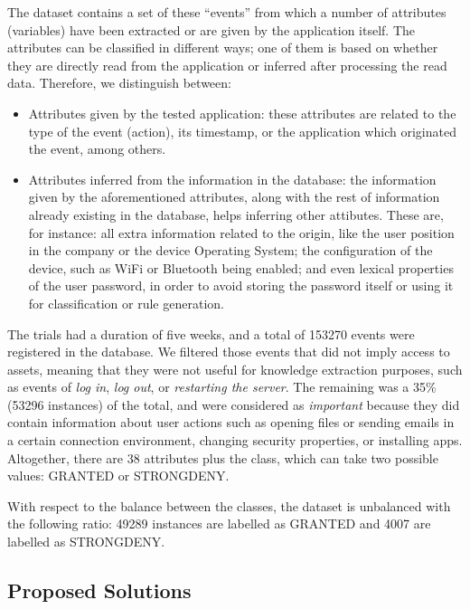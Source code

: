 \documentclass[a4paper,10pt,twocolumn,preprint,3p]{elsarticle}
\begin{document}
The dataset contains a set of these ``events'' from which a number of attributes (variables) have been extracted or are given by the application itself. The attributes can be classified in different ways; one of them is based on whether they are directly read from the application or inferred after processing the read data. Therefore, we distinguish between:
\begin{itemize}
  \item Attributes given by the tested application: these attributes
    are related to the type of the event (action), its timestamp, or
    the application which originated the event, among others. 
  \item Attributes inferred from the information in the database: the information given by the aforementioned attributes, along with the rest of information already existing in the database, helps inferring other attibutes. These are, for instance: all extra information related to the origin, like the user position in the company or the device Operating System; the configuration of the device, such as WiFi or Bluetooth being enabled; and even lexical properties of the user password, in order to avoid storing the password itself or using it for classification or rule generation.
\end{itemize}

The trials had a duration of five weeks, and a total of 
153270 events were registered in the database. We filtered those events that did not imply access to assets, meaning that they were not useful for
knowledge extraction purposes, such as events of \textit{log in},
\textit{log out}, or \textit{restarting the server}. %
The remaining was a 35\% (53296 instances) of the total, and were considered as \textit{important}
because they did contain information about user actions such as
opening files or sending emails in a certain connection environment,
changing security properties, or installing apps. Altogether, there
are 38 attributes plus the class, which can take two possible values:
GRANTED or STRONGDENY. 

With respect to the balance between the classes, the dataset is
unbalanced with the following ratio: 49289 instances are labelled as
GRANTED and 4007 are labelled as STRONGDENY. 

\subsection{Proposed Solutions}
\label{subsec:solution}
\end{document}
